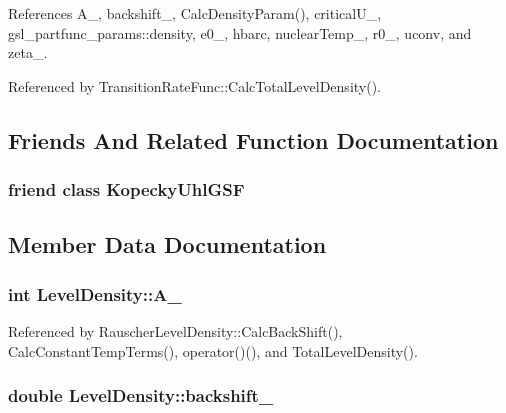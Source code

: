 References A\-\_\-, backshift\-\_\-, Calc\-Density\-Param(), critical\-U\-\_\-, gsl\-\_\-partfunc\-\_\-params\-::density, e0\-\_\-, hbarc, nuclear\-Temp\-\_\-, r0\-\_\-, uconv, and zeta\-\_\-.



Referenced by Transition\-Rate\-Func\-::\-Calc\-Total\-Level\-Density().



\subsection{Friends And Related Function Documentation}
\hypertarget{classLevelDensity_a82f9f4a3eb74ca7e08cb54054e30cd76}{
\subsubsection[{Kopecky\-Uhl\-G\-S\-F}]{\setlength{\rightskip}{0pt plus 5cm}friend class {\bf Kopecky\-Uhl\-G\-S\-F}\hspace{0.3cm}{\ttfamily [friend]}}}\label{classLevelDensity_a82f9f4a3eb74ca7e08cb54054e30cd76}


\subsection{Member Data Documentation}
\hypertarget{classLevelDensity_a49a372560d87e4bfda8759eb315a10ed}{
\subsubsection[{A\-\_\-}]{\setlength{\rightskip}{0pt plus 5cm}int Level\-Density\-::\-A\-\_\-\hspace{0.3cm}{\ttfamily [protected]}}}\label{classLevelDensity_a49a372560d87e4bfda8759eb315a10ed}


Referenced by Rauscher\-Level\-Density\-::\-Calc\-Back\-Shift(), Calc\-Constant\-Temp\-Terms(), operator()(), and Total\-Level\-Density().

\hypertarget{classLevelDensity_ab38ac8b223b47b3f627b1d1443168b28}{
\subsubsection[{backshift\-\_\-}]{\setlength{\rightskip}{0pt plus 5cm}double Level\-Density\-::backshift\-\_\-\hspace{0.3cm}{\ttfamily [protected]}}}\label{classLevelDensity_ab38ac8b223b47b3f627b1d1443168b28}


